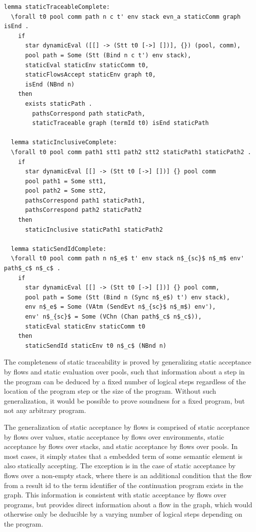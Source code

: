 \documentclass[10pt]{article}
\begin{document}
\begin{lstlisting}[language=logic, mathescape]
  lemma staticTraceableComplete:
  \forall t0 pool comm path n c t' env stack evn_a staticComm graph isEnd .
    if
      star dynamicEval ([[] -> (Stt t0 [->] [])], {}) (pool, comm), 
      pool path = Some (Stt (Bind n c t') env stack),
      staticEval staticEnv staticComm t0,
      staticFlowsAccept staticEnv graph t0,
      isEnd (NBnd n)
    then
      exists staticPath . 
        pathsCorrespond path staticPath, 
        staticTraceable graph (termId t0) isEnd staticPath

  lemma staticInclusiveComplete:
  \forall t0 pool comm path1 stt1 path2 stt2 staticPath1 staticPath2 . 
    if
      star dynamicEval [[] -> (Stt t0 [->] [])] {} pool comm
      pool path1 = Some stt1, 
      pool path2 = Some stt2, 
      pathsCorrespond path1 staticPath1, 
      pathsCorrespond path2 staticPath2
    then
      staticInclusive staticPath1 staticPath2

  lemma staticSendIdComplete:
  \forall t0 pool comm path n n$_e$ t' env stack n$_{sc}$ n$_m$ env' path$_c$ n$_c$ .
    if
      star dynamicEval [[] -> (Stt t0 [->] [])] {} pool comm, 
      pool path = Some (Stt (Bind n (Sync n$_e$) t') env stack), 
      env n$_e$ = Some (VAtm (SendEvt n$_{sc}$ n$_m$) env'), 
      env' n$_{sc}$ = Some (VChn (Chan path$_c$ n$_c$)), 
      staticEval staticEnv staticComm t0
    then 
      staticSendId staticEnv t0 n$_c$ (NBnd n)
\end{lstlisting}

The completeness of static traceability is proved by generalizing
static acceptance by flows and static evaluation over pools, such that information about a step in
the program can be deduced by a fixed number of logical steps regardless of the location of the
program step or the size of the program. Without such generalization, it would be possible to
prove soundness for a fixed program, but not any arbitrary program.

The generalization of static acceptance by flows is comprised of static acceptance by flows over values,
static acceptance by flows over environments, static acceptance by flows over stacks, and static
acceptance by flows over pools.
In most cases, it simply states that a embedded term of some semantic element is also statically
accepting. The exception is in the case of
static acceptance by flows over a non-empty stack, where
there is an additional condition that the flow
from a result id to the term identifier
of the continuation program exists in the graph.
This information is consistent with static
acceptance by flows over programs, but provides direct information about a flow in the
graph, which would otherwise only be deducible by a varying number of logical steps
depending on the program.
\end{document}
